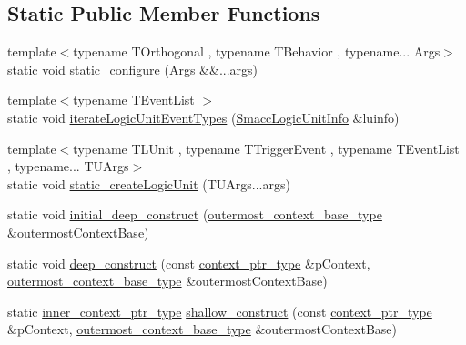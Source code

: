 \subsection*{Static Public Member Functions}
\begin{DoxyCompactItemize}
\item 
{\footnotesize template$<$typename T\+Orthogonal , typename T\+Behavior , typename... Args$>$ }\\static void \hyperlink{classsmacc_1_1SmaccState_a3e335f3290e4968db0c8e22bf88356b7}{static\+\_\+configure} (Args \&\&...args)
\item 
{\footnotesize template$<$typename T\+Event\+List $>$ }\\static void \hyperlink{classsmacc_1_1SmaccState_a234cb467d9054c636f9ee77f1174b253}{iterate\+Logic\+Unit\+Event\+Types} (\hyperlink{structsmacc_1_1introspection_1_1SmaccLogicUnitInfo}{Smacc\+Logic\+Unit\+Info} \&luinfo)
\item 
{\footnotesize template$<$typename T\+L\+Unit , typename T\+Trigger\+Event , typename T\+Event\+List , typename... T\+U\+Args$>$ }\\static void \hyperlink{classsmacc_1_1SmaccState_a6fc90cf59c60c749e82f49aafb079b23}{static\+\_\+create\+Logic\+Unit} (T\+U\+Args...\+args)
\item 
static void \hyperlink{classsmacc_1_1SmaccState_af4b4635d16a32bdd3956e5d40ddbd01d}{initial\+\_\+deep\+\_\+construct} (\hyperlink{classsmacc_1_1SmaccState_aaf76bbe2aa9dd73e3284605f84ab4b16}{outermost\+\_\+context\+\_\+base\+\_\+type} \&outermost\+Context\+Base)
\item 
static void \hyperlink{classsmacc_1_1SmaccState_aac23d8a6909f75c5e5fca2a7c09b5368}{deep\+\_\+construct} (const \hyperlink{classsmacc_1_1SmaccState_a0e15b77514301039f6bc093a9d3f6425}{context\+\_\+ptr\+\_\+type} \&p\+Context, \hyperlink{classsmacc_1_1SmaccState_aaf76bbe2aa9dd73e3284605f84ab4b16}{outermost\+\_\+context\+\_\+base\+\_\+type} \&outermost\+Context\+Base)
\item 
static \hyperlink{classsmacc_1_1SmaccState_a65a772c2e2039e9a59148ba6ffb54d8a}{inner\+\_\+context\+\_\+ptr\+\_\+type} \hyperlink{classsmacc_1_1SmaccState_a1dccb401e1a99031863a21a590d953e6}{shallow\+\_\+construct} (const \hyperlink{classsmacc_1_1SmaccState_a0e15b77514301039f6bc093a9d3f6425}{context\+\_\+ptr\+\_\+type} \&p\+Context, \hyperlink{classsmacc_1_1SmaccState_aaf76bbe2aa9dd73e3284605f84ab4b16}{outermost\+\_\+context\+\_\+base\+\_\+type} \&outermost\+Context\+Base)
\end{DoxyCompactItemize}
